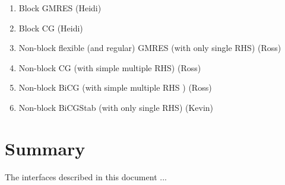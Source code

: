 \documentclass[pdf,ps2pdf,11pt]{SANDreport}
\begin{document}
\begin{enumerate}
\item Block GMRES (Heidi)
\item Block CG (Heidi)
\item Non-block flexible (and regular) GMRES (with only single RHS) (Ross)
\item Non-block CG (with simple multiple RHS) (Ross)
\item Non-block BiCG (with simple multiple RHS ) (Ross)
\item Non-block BiCGStab (with only single RHS) (Kevin)
\end{enumerate}

\section{Summary}

The interfaces described in this document ...

%
\clearpage



%
%
\end{document}
